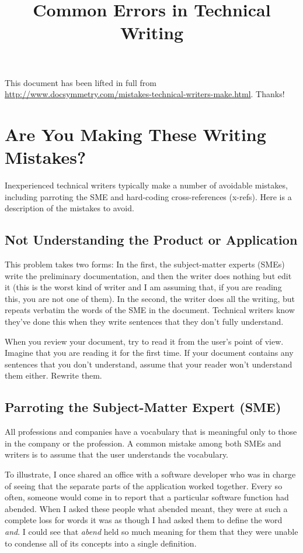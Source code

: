 \documentclass[12pt]{article}
\title{Common Errors in Technical Writing}
\author{}
\begin{document}
\maketitle

This document has been lifted in full from \href{http://www.docsymmetry.com/mistakes-technical-writers-make.html}{http://www.docsymmetry.com/mistakes-technical-writers-make.html}. Thanks!

\section{Are You Making These Writing Mistakes?}

Inexperienced technical writers typically make a number of avoidable mistakes, including parroting the SME and hard-coding cross-references (x-refs). Here is a description of the mistakes to avoid.

\subsection{Not Understanding the Product or Application}

This problem takes two forms: In the first, the subject-matter experts (SMEs) write the preliminary documentation, and then the writer does nothing but edit it (this is the worst kind of writer and I am assuming that, if you are reading this, you are not one of them). In the second, the writer does all the writing, but repeats verbatim the words of the SME in the document. Technical writers know they've done this when they write sentences that they don't fully understand.

When you review your document, try to read it from the user's point of view. Imagine that you are reading it for the first time. If your document contains any sentences that you don't understand, assume that your reader won't understand them either. Rewrite them.

\subsection{Parroting the Subject-Matter Expert (SME)}
All professions and companies have a vocabulary that is meaningful only to those in the company or the profession. A common mistake among both SMEs and writers is to assume that the user understands the vocabulary.

To illustrate, I once shared an office with a software developer who was in charge of seeing that the separate parts of the application worked together. Every so often, someone would come in to report that a particular software function had abended. When I
asked these people what abended meant, they were at such a complete loss for words it was as though I had asked them to define the word \emph{and}. I could see that \emph{abend} held so much meaning for them that they were unable to condense all of its concepts into a single definition.
\end{document}
